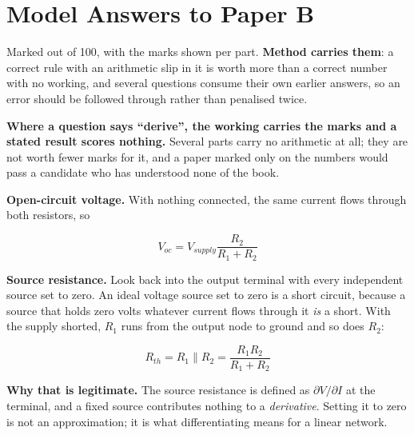
\renewcommand{\answerprefix}{ansb}

\chapter{Model Answers to Paper B}
\label{ansb:ch:answers}

Marked out of 100, with the marks shown per part. \textbf{Method carries them}: a
correct rule with an arithmetic slip in it is worth more than a correct number with no
working, and several questions consume their own earlier answers, so an error should be
followed through rather than penalised twice.

\textbf{Where a question says ``derive'', the working carries the marks
and a stated result scores nothing.} Several parts carry no arithmetic at all;
they are not worth fewer marks for it, and a paper marked only on the numbers
would pass a candidate who has understood none of the book.



\textbf{Open-circuit voltage.} With nothing connected, the same current flows through both resistors, so

\[
  V_{oc} = V_{supply}\frac{R_2}{R_1 + R_2}
\]

\textbf{Source resistance.} Look back into the output terminal with every independent source set to zero. An ideal voltage source set to zero is a short circuit, because a source that holds zero volts whatever current flows through it \emph{is} a short. With the supply shorted, $R_1$ runs from the output node to ground and so does $R_2$:

\[
  R_{th} = R_1 \parallel R_2 = \frac{R_1 R_2}{R_1 + R_2}
\]

\textbf{Why that is legitimate.} The source resistance is defined as $\partial V/\partial I$ at the terminal, and a fixed source contributes nothing to a \emph{derivative}. Setting it to zero is not an approximation; it is what differentiating means for a linear network.


